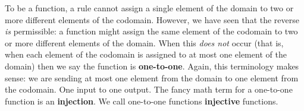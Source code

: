 \documentclass[10pt,]{memoir}
\newcommand{\terminology}[1]{\textbf{#1}}
\theoremstyle{plain}
\theoremstyle{definition}
\theoremstyle{definition}
\theoremstyle{definition}
\numberwithin{equation}{chapter}
\begin{document}
      To be a function, a rule cannot assign a single element of the domain to two or more different elements of the codomain. However, we have seen that the reverse \emph{is} permissible: a function might assign the same element of the codomain to two or more different elements of the domain. When this \emph{does not} occur (that is, when each element of the codomain is assigned to at most one element of the domain) then we say the function is
      \terminology{one-to-one}. Again, this terminology makes sense: we are sending at most one element from the domain to one element from the codomain. One input to one output. The fancy math term for a one-to-one function is an
      \terminology{injection}. We call one-to-one functions
      \terminology{injective} functions.
\par
\end{document}
